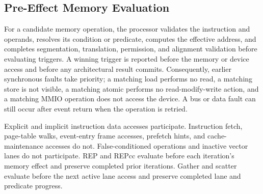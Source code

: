 \subsection{Pre-Effect Memory Evaluation}
For a candidate memory operation, the processor validates the instruction and operands, resolves its condition or
predicate, computes the effective address, and completes segmentation, translation, permission, and alignment
validation before evaluating triggers. A winning trigger is reported before the memory or device access and before
any architectural result commits. Consequently, earlier synchronous faults take priority; a matching load performs
no read, a matching store is not visible, a matching atomic performs no read-modify-write action, and a matching MMIO
operation does not access the device. A bus or data fault can still occur after event return when the operation is
retried.

Explicit and implicit instruction data accesses participate. Instruction fetch, page-table walks, event-entry frame
accesses, prefetch hints, and cache-maintenance accesses do not. False-conditioned operations and inactive vector
lanes do not participate. REP and REPcc evaluate before each iteration's memory effect and preserve completed prior
iterations. Gather and scatter evaluate before the next active lane access and preserve completed lane and predicate
progress.
